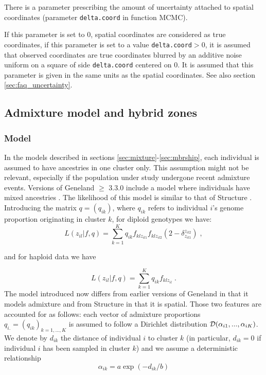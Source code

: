 \documentclass[a4paper,10pt]{article}
\begin{document}
There is a parameter prescribing the amount of uncertainty attached to spatial coordinates (parameter \texttt{delta.coord} in function MCMC).

If this parameter is set to 0, spatial coordinates are
    considered as true coordinates, if this parameter is set to a value  \texttt{delta.coord}$>$0, 
it is assumed that observed
  coordinates are true coordinates blurred by an additive noise uniform
  on a square of side \texttt{delta.coord} centered on 0. It is assumed that this parameter is given in  the same units as 
the spatial coordinates. See also section \ref{sec:faq_uncertainty}. 



\subsection{Admixture model and hybrid zones} 

\subsubsection{Model}

In the models described in sections \ref{sec:mixture}-\ref{sec:mbrship}, each individual is assumed to have ancestries in one cluster only. 
This assumption might not be relevant, especially if the population under study undergone recent admixture events. 
Versions of {\sc Geneland} $\geq$  3.3.0 include a model where individuals have mixed ancestries \citep{Guedj11}. 
The likelihood of this model is similar to that of {\sc Structure} \citep{Pritchard00}.
Introducing the matrix $q=(q_{ik})$, where $q_{ik}$ refers to individual $i$'s genome proportion originating in cluster $k$, 
for diploid genotypes we have:
\begin{equation}\label{eq:admix_like}
L(z_{il} | f,q) = \sum_{k=1}^K q_{ik} f_{klz_{il1}}f_{klz_{il2}} (2- \delta_{z_{il1}}^{z_{il2}}) \;,
\end{equation}

and for haploid data we have

\begin{equation}\label{eq:admix_like}
L(z_{il} | f,q) = \sum_{k=1}^K q_{ik} f_{klz_{il}}\;.
\end{equation}
The model introduced now differs from earlier versions of {\sc Geneland} in that it  models admixture 
and from {\sc Structure} in that it is spatial. Those two features are accounted for as follows:
each vector of admixture proportions $q_{i.}=(q_{ik})_{k=1,...,K}$ is assumed to follow a  
Dirichlet distribution ${\cal D}(\alpha_{i1},...,\alpha_{iK})$.
We denote by $d_{ik}$ the distance of individual $i$ to cluster $k$ (in particular,  $d_{ik}=0$ 
if individual $i$ has been sampled in cluster $k$) 
and we assume a deterministic  relationship 
\begin{equation}\label{eq:def_alpha}
\alpha_{ik} = a\exp(-d_{ik}/b)
\end{equation}
\end{document}

